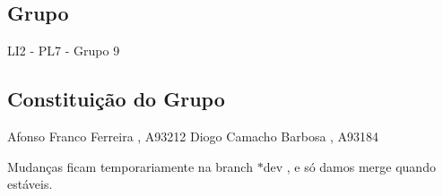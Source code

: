 \subsection*{Grupo}

L\+I2 -\/ P\+L7 -\/ Grupo 9

\subsection*{Constituição do Grupo}

Afonso Franco Ferreira , A93212 Diogo Camacho Barbosa , A93184

Mudanças ficam temporariamente na branch $\ast$dev , e só damos merge quando estáveis. 